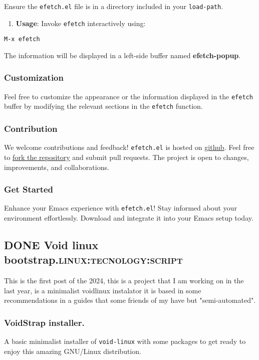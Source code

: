 \documentclass[11pt]{article}
\begin{document}
Ensure the \texttt{efetch.el} file is in a directory included in your \texttt{load-path}.

\begin{enumerate}
\item \textbf{\textbf{Usage}}: Invoke \texttt{efetch} interactively using:
\end{enumerate}

\begin{verbatim}
M-x efetch
\end{verbatim}

The information will be displayed in a left-side buffer named \textbf{efetch-popup}.
\subsubsection{Customization}
\label{sec:orga6f059f}
Feel free to customize the appearance or the information displayed in the \texttt{efetch} buffer by modifying the relevant sections in the \texttt{efetch} function.
\subsubsection{Contribution}
\label{sec:org44585b8}
We welcome contributions and feedback! \texttt{efetch.el} is hosted on \href{https://github.com/engjpacheco/efetch.el}{github}. Feel free to \href{https://github.com/engjpacheco/efetch.el/fork}{fork the repository} and submit pull requests. 
The project is open to changes, improvements, and collaborations.
\subsubsection{Get Started}
\label{sec:orgd2df2c4}

Enhance your Emacs experience with \texttt{efetch.el}! Stay informed about your environment effortlessly. Download and integrate it into your Emacs setup today.
\subsection{{\bfseries\sffamily DONE} Void linux bootstrap.\hfill{}\textsc{linux:tecnology:script}}
\label{sec:orga890237}
\begin{PREVIEW}
This is the first post of the 2024, this is a project that I am working on in the last
year, is a minimalist voidlinux instalator it is based in some recommendations in 
a guides that some friends of my have but "semi-automated".
\end{PREVIEW}
\subsubsection{VoidStrap installer.}
\label{sec:orgea883b6}
A basic minimalist installer of \texttt{void-linux} with some packages to get ready to enjoy
this amazing GNU/Linux distribution.
\end{document}
